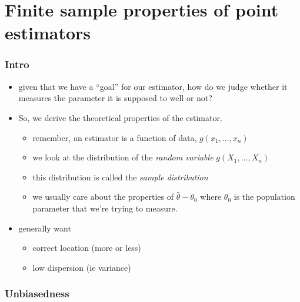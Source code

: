 

\part*{Finite sample properties of point estimators}%

\section{Intro}

\begin{itemize}
\item given that we have a ``goal'' for our estimator, how do we judge
     whether it measures the parameter it is supposed to well or not?
\item So, we derive the theoretical properties of the estimator.
\begin{itemize}
\item remember, an estimator is a function of data, $g(x_1,\dots,x_n)$
\item we look at the distribution of the \emph{random variable} $g(X_1,\dots,X_n)$
\item this distribution is called the \emph{sample distribution}
\item we usually care about the properties of $\hat \theta -
       \theta_0$ where $\theta_0$ is the population parameter that
       we're trying to measure.
\end{itemize}
\item generally want
\begin{itemize}
\item correct location (more or less)
\item low dispersion (ie variance)
\end{itemize}
\end{itemize}

\section{Unbiasedness}

